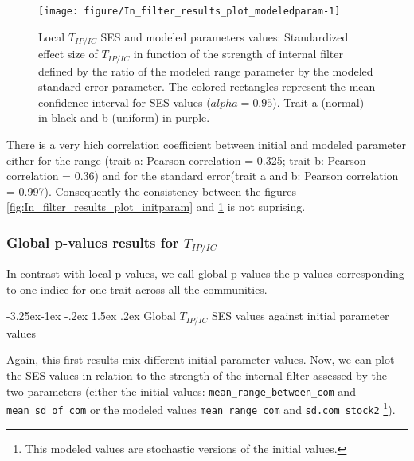 \documentclass[12pt]{article}\usepackage[]{graphicx}\usepackage[]{color}
\makeatletter
\newenvironment{knitrout}{}{} %
\newcounter {subsubsubsection}[subsubsection]
\newcommand\subsubsubsection{\@startsection{subsubsubsection}{4}{\z@}%
          {-3.25ex\@plus -1ex \@minus -.2ex}%
          {1.5ex \@plus .2ex}%
          {\normalfont\normalsize\bfseries}}
\makeatother
\begin{document}
\begin{knitrout}
\begin{figure}
{\centering \texttt{[image: figure/In\_filter\_results\_plot\_modeledparam-1]} 

}

\caption[Local $T_{IP/IC}$ SES and modeled parameters values]{Local $T_{IP/IC}$ SES and modeled parameters values: Standardized effect size of $T_{IP/IC}$ in function of the strength of internal filter defined by the ratio of the modeled range parameter by the modeled standard error parameter. The colored rectangles represent the mean confidence interval for SES values ($alpha = 0.95$). Trait a (normal) in black and b (uniform) in purple.\label{fig:In_filter_results_plot_modeledparam}}
\end{figure}


\end{knitrout}

There is a very hich correlation coefficient between initial and modeled parameter either for the range (trait a: Pearson correlation = 0.325; trait b: Pearson correlation = 0.36) and for the standard error(trait a and b: Pearson correlation = 0.997). Consequently the consistency between the figures \ref{fig:In_filter_results_plot_initparam} and  \ref{fig:In_filter_results_plot_modeledparam} is not suprising. 
 
 \subsubsection {Global p-values results for $T_{IP/IC}$}
In contrast with local p-values, we call global p-values the p-values corresponding to one indice for one trait across all the communities. 

  \subsubsubsection {Global $T_{IP/IC}$ SES values against initial parameter values}
  
Again, this first results mix different initial parameter values. Now, we can plot the SES values in relation to the strength of the internal filter assessed by the two parameters (either the initial values: \texttt{mean\_range\_between\_com} and \texttt{mean\_sd\_of\_com} or the modeled values \texttt{mean\_{}range\_{}com} and \texttt{sd.com\_{}stock2} \footnote{This modeled values are stochastic versions of the initial values.}). 
\end{document}
